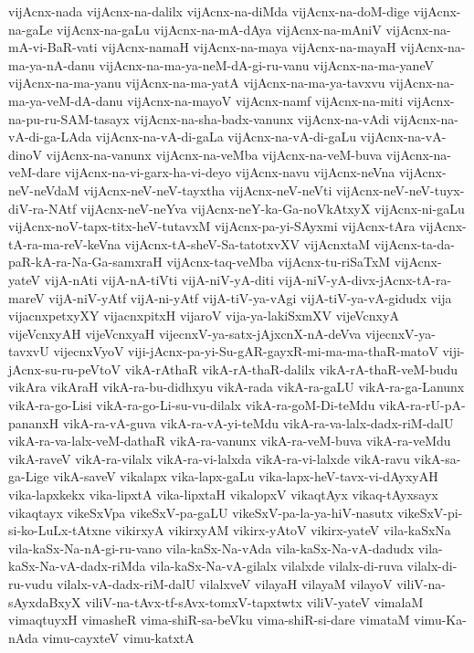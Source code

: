 {vijAcnx-nada
vijAcnx-na-dalilx
vijAcnx-na-diMda
vijAcnx-na-doM-dige
vijAcnx-na-gaLe
vijAcnx-na-gaLu
vijAcnx-na-mA-dAya
vijAcnx-na-mAniV
vijAcnx-na-mA-vi-BaR-vati
vijAcnx-namaH
vijAcnx-na-maya
vijAcnx-na-mayaH
vijAcnx-na-ma-ya-nA-danu
vijAcnx-na-ma-ya-neM-dA-gi-ru-vanu
vijAcnx-na-ma-yaneV
vijAcnx-na-ma-yanu
vijAcnx-na-ma-yatA
vijAcnx-na-ma-ya-tavxvu
vijAcnx-na-ma-ya-veM-dA-danu
vijAcnx-na-mayoV
vijAcnx-namf
vijAcnx-na-miti
vijAcnx-na-pu-ru-SAM-tasayx
vijAcnx-na-sha-badx-vanunx
vijAcnx-na-vAdi
vijAcnx-na-vA-di-ga-LAda
vijAcnx-na-vA-di-gaLa
vijAcnx-na-vA-di-gaLu
vijAcnx-na-vA-dinoV
vijAcnx-na-vanunx
vijAcnx-na-veMba
vijAcnx-na-veM-buva
vijAcnx-na-veM-dare
vijAcnx-na-vi-garx-ha-vi-deyo
vijAcnx-navu
vijAcnx-neVna
vijAcnx-neV-neVdaM
vijAcnx-neV-neV-tayxtha
vijAcnx-neV-neVti
vijAcnx-neV-neV-tuyx-diV-ra-NAtf
vijAcnx-neV-neYva
vijAcnx-neY-ka-Ga-noVkAtxyX
vijAcnx-ni-gaLu
vijAcnx-noV-tapx-titx-heV-tutavxM
vijAcnx-pa-yi-SAyxmi
vijAcnx-tAra
vijAcnx-tA-ra-ma-reV-keVna
vijAcnx-tA-sheV-Sa-tatotxvXV
vijAcnxtaM
vijAcnx-ta-da-paR-kA-ra-Na-Ga-samxraH
vijAcnx-taq-veMba
vijAcnx-tu-riSaTxM
vijAcnx-yateV
vijA-nAti
vijA-nA-tiVti
vijA-niV-yA-diti
vijA-niV-yA-divx-jAcnx-tA-ra-mareV
vijA-niV-yAtf
vijA-ni-yAtf
vijA-tiV-ya-vAgi
vijA-tiV-ya-vA-gidudx
vija
vijacnxpetxyXY
vijacnxpitxH
vijaroV
vija-ya-lakiSxmXV
vijeVcnxyA
vijeVcnxyAH
vijeVcnxyaH
vijecnxV-ya-satx-jAjxcnX-nA-deVva
vijecnxV-ya-tavxvU
vijecnxVyoV
viji-jAcnx-pa-yi-Su-gAR-gayxR-mi-ma-ma-thaR-matoV
viji-jAcnx-su-ru-peVtoV
vikA-rAthaR
vikA-rA-thaR-dalilx
vikA-rA-thaR-veM-budu
vikAra
vikAraH
vikA-ra-bu-didhxyu
vikA-rada
vikA-ra-gaLU
vikA-ra-ga-Lanunx
vikA-ra-go-Lisi
vikA-ra-go-Li-su-vu-dilalx
vikA-ra-goM-Di-teMdu
vikA-ra-rU-pA-pananxH
vikA-ra-vA-guva
vikA-ra-vA-yi-teMdu
vikA-ra-va-lalx-dadx-riM-dalU
vikA-ra-va-lalx-veM-dathaR
vikA-ra-vanunx
vikA-ra-veM-buva
vikA-ra-veMdu
vikA-raveV
vikA-ra-vilalx
vikA-ra-vi-lalxda
vikA-ra-vi-lalxde
vikA-ravu
vikA-sa-ga-Lige
vikA-saveV
vikalapx
vika-lapx-gaLu
vika-lapx-heV-tavx-vi-dAyxyAH
vika-lapxkekx
vika-lipxtA
vika-lipxtaH
vikalopxV
vikaqtAyx
vikaq-tAyxsayx
vikaqtayx
vikeSxVpa
vikeSxV-pa-gaLU
vikeSxV-pa-la-ya-hiV-nasutx
vikeSxV-pi-si-ko-LuLx-tAtxne
vikirxyA
vikirxyAM
vikirx-yAtoV
vikirx-yateV
vila-kaSxNa
vila-kaSx-Na-nA-gi-ru-vano
vila-kaSx-Na-vAda
vila-kaSx-Na-vA-dadudx
vila-kaSx-Na-vA-dadx-riMda
vila-kaSx-Na-vA-gilalx
vilalxde
vilalx-di-ruva
vilalx-di-ru-vudu
vilalx-vA-dadx-riM-dalU
vilalxveV
vilayaH
vilayaM
vilayoV
viliV-na-sAyxdaBxyX
viliV-na-tAvx-tf-sAvx-tomxV-tapxtwtx
viliV-yateV
vimalaM
vimaqtuyxH
vimasheR
vima-shiR-sa-beVku
vima-shiR-si-dare
vimataM
vimu-Ka-nAda
vimu-cayxteV
vimu-katxtA
}
